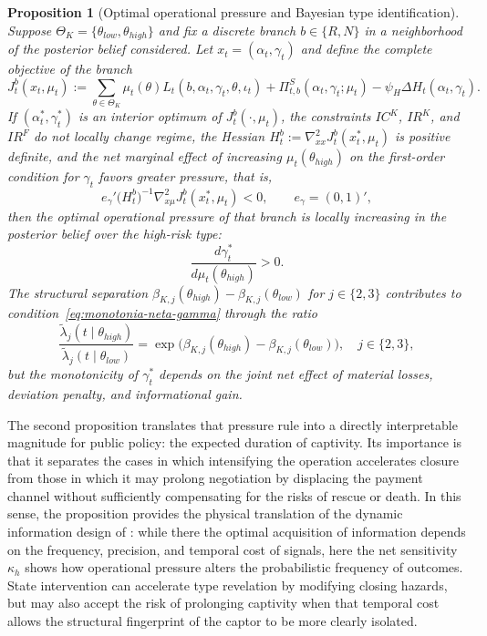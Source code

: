 \documentclass[review,authoryear,12pt]{elsarticle}
\theoremstyle{plain}
\newtheorem{proposition}[theorem]{Proposition}
\theoremstyle{definition}
\newcommand{\ThetaK}{\Theta_K}
\newcommand{\1}{\mathbf{1}}
\begin{document}
\begin{proposition}[Optimal operational pressure and Bayesian type identification]
\label{prop:optimal-gamma-beliefs}
Suppose $\ThetaK=\{\theta_{low},\theta_{high}\}$ and fix a discrete branch $b\in\{R,N\}$ in a neighborhood of the posterior belief considered. Let $x_t=(\alpha_t,\gamma_t)$ and define the complete objective of the branch
\begin{equation}
\label{eq:obj-rama-completo}
J_t^b(x_t,\mu_t)
:=
\sum_{\theta\in\ThetaK}\mu_t(\theta)L_t(b,\alpha_t,\gamma_t,\theta,\iota_t)
+\Pi_{t,b}^{S}(\alpha_t,\gamma_t;\mu_t)
-\psi_H\Delta H_t(\alpha_t,\gamma_t).
\end{equation}
If $(\alpha_t^\ast,\gamma_t^\ast)$ is an interior optimum of $J_t^b(\cdot,\mu_t)$, the constraints $IC^K$, $IR^K$, and $IR^F$ do not locally change regime, the Hessian $H_t^b:=\nabla_{xx}^2J_t^b(x_t^\ast,\mu_t)$ is positive definite, and the net marginal effect of increasing $\mu_t(\theta_{high})$ on the first-order condition for $\gamma_t$ favors greater pressure, that is,
\begin{equation}
\label{eq:monotonia-neta-gamma}
e_\gamma'
\bigl(H_t^b\bigr)^{-1}
\nabla_{x\mu}^2J_t^b(x_t^\ast,\mu_t)
<0,
\qquad
e_\gamma=(0,1)',
\end{equation}
then the optimal operational pressure of that branch is locally increasing in the posterior belief over the high-risk type:
\[
\frac{d\gamma_t^\ast}{d\mu_t(\theta_{high})} > 0.
\]
The structural separation $\beta_{K,j}(\theta_{high})-\beta_{K,j}(\theta_{low})$ for $j\in\{2,3\}$ contributes to condition~\eqref{eq:monotonia-neta-gamma} through the ratio
\[
\frac{\tilde\lambda_j(t\mid\theta_{high})}{\tilde\lambda_j(t\mid\theta_{low})}
=\exp\!\bigl(\beta_{K,j}(\theta_{high})-\beta_{K,j}(\theta_{low})\bigr),
\quad j\in\{2,3\},
\]
but the monotonicity of $\gamma_t^\ast$ depends on the joint net effect of material losses, deviation penalty, and informational gain.
\end{proposition}

\noindent The second proposition translates that pressure rule into a directly interpretable magnitude for public policy: the expected duration of captivity. Its importance is that it separates the cases in which intensifying the operation accelerates closure from those in which it may prolong negotiation by displacing the payment channel without sufficiently compensating for the risks of rescue or death. In this sense, the proposition provides the physical translation of the dynamic information design of \citet{Zhong2022}: while there the optimal acquisition of information depends on the frequency, precision, and temporal cost of signals, here the net sensitivity $\kappa_h$ shows how operational pressure alters the probabilistic frequency of outcomes. State intervention can accelerate type revelation by modifying closing hazards, but may also accept the risk of prolonging captivity when that temporal cost allows the structural fingerprint of the captor to be more clearly isolated.
\end{document}
